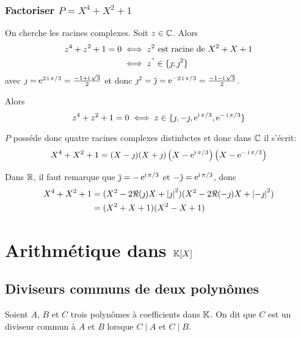 \subsubsection{Factoriser \(P=X^4+X^2+1\)}

On cherche les racines complexes. Soit \(z \in \mathbb{C}\). Alors
\begin{align}
  z^4+z^2+1=0 &\iff z^2 \text{~est racine de~} X^2+X+1 \\
  &\iff z^" \in \{\jmath ; \jmath^2\}
\end{align}
avec \(\jmath=\operatorname{e}^{2\operatorname{i}\pi/3} = \frac{-1+\operatorname{i}\sqrt{3}}{2}\) et donc \(\jmath^2=\overline{\jmath} = \operatorname{e}^{-2\operatorname{i}\pi/3} = \frac{-1-\operatorname{i}\sqrt{3}}{2}\). 

Alors
\begin{equation}
  z^4+z^2+1=0 \iff z \in \{\jmath, -\jmath, \operatorname{e}^{\operatorname{i}\pi/3}, \operatorname{e}^{-\operatorname{i}\pi/3}\}
\end{equation}

\(P\) posséde donc quatre racines complexes distinbctes et donc dans \(\mathbb{C}\) il s'écrit:
\begin{equation}
  X^4+X^2+1 = (X-\jmath)(X+\jmath)\left(X-\operatorname{e}^{\operatorname{i}\pi/3}\right)\left(X-\operatorname{e}^{-\operatorname{i}\pi/3}\right)
\end{equation}

Dans \(\mathbb{R}\), il faut remarque que \(\overline{\jmath}=-\operatorname{e}^{\operatorname{i}\pi/3}\) et \(-\overline{\jmath}=\operatorname{e}^{\operatorname{i}\pi/3}\), donc
\begin{align}
  X^4+X^2+1 &= (X^2-2\Re(\jmath)X+\left\lvert\jmath\right\rvert^2)(X^2-2\Re(-\jmath)X+\left\lvert-\jmath\right\rvert^2)\\
  &=(X^2+X+1)(X^2-X+1)
\end{align}

\section{Arithmétique dans \(\mathbb{K}[X]\)}

\subsection{Diviseurs communs de deux polynômes}

\begin{defdef}
  Soient \(A\), \(B\) et \(C\) trois polynômes à coefficients dans \(\mathbb{K}\). On dit que \(C\) est un diviseur commun à \(A\) et \(B\) lorsque \(C\mid{}A\) et \(C\mid{}B\).
\end{defdef}

